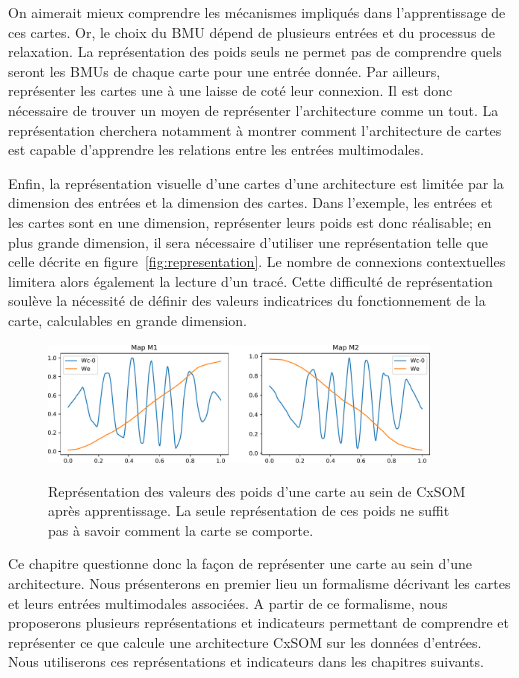 On aimerait mieux comprendre les mécanismes impliqués dans l'apprentissage de ces cartes. Or, le choix du BMU dépend de plusieurs entrées et du processus de relaxation. La représentation des poids seuls ne permet pas de comprendre quels seront les BMUs de chaque carte pour une entrée donnée. 
Par ailleurs, représenter les cartes une à une laisse de coté leur connexion. Il est donc nécessaire de trouver un moyen de représenter l'architecture comme un tout. La représentation cherchera notamment à montrer comment l'architecture de cartes est capable d'apprendre les relations entre les entrées multimodales.

Enfin, la représentation visuelle d'une cartes d'une architecture est limitée par la dimension des entrées et la dimension des cartes. Dans l'exemple, les entrées et les cartes sont en une dimension, représenter leurs poids est donc réalisable; en plus grande dimension, il sera nécessaire d'utiliser une représentation telle que celle décrite en figure~\ref{fig:representation}. Le nombre de connexions contextuelles limitera alors également la lecture d'un tracé. Cette difficulté de représentation soulève la nécessité de définir des valeurs indicatrices du fonctionnement de la carte, calculables en grande dimension.

\begin{figure}
\centering
\includegraphics[width=0.9\textwidth]{weights_cercle1.pdf}
\label{fig:weights}
\caption{Représentation des valeurs des poids d'une carte au sein de CxSOM après apprentissage. La seule représentation de ces poids ne suffit pas à savoir comment la carte se comporte.}
\end{figure}



Ce chapitre questionne donc la façon de représenter une carte au sein d'une architecture. Nous présenterons en premier lieu un formalisme décrivant les cartes et leurs entrées multimodales associées. A partir de ce formalisme, nous proposerons plusieurs représentations et indicateurs permettant de comprendre et représenter ce que calcule une architecture CxSOM sur les données d'entrées. Nous utiliserons ces représentations et indicateurs dans les chapitres suivants. 

